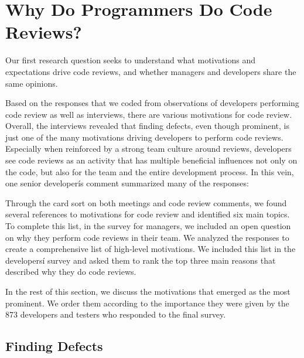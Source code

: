 
\section{Why Do Programmers Do Code Reviews?} \label{sec:expectations}


Our first research question seeks to understand what motivations and
expectations drive code reviews, and whether managers and developers share the
same opinions.

Based on the responses that we coded from observations of developers performing
code review as well as interviews, there are various motivations for code
review. Overall, the interviews revealed that finding defects, even though
prominent, is just one of the many motivations driving developers to perform
code reviews. Especially when reinforced by a strong team culture around
reviews, developers see code reviews as an activity that has multiple
beneficial influences not only on the code, but also for the team and the
entire development process. In this vein, one senior developerís comment
summarized many of the responses: 

Through the card sort on both meetings and code review comments, we found
several references to motivations for code review and identified six main
topics. To complete this list, in the survey for managers, we included an open
question on why they perform code reviews in their team. We analyzed the
responses to create a comprehensive list of high-level motivations. We included
this list in the developersí survey and asked them to rank the top three main
reasons that described why they do code reviews.

In the rest of this section, we discuss the motivations that emerged as the
most prominent. We order them according to the importance they were given by
the 873 developers and testers who responded to the final survey.

\subsection{Finding Defects}

